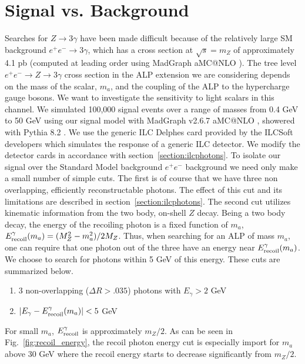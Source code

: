 \documentclass[aps,onecolumn,twoside,secnumarabic,12pt,balancelastpage,amsmath,amssymb,nofootinbib,hyperref=pdftex]{revtex4}
\begin{document}
\section{Signal vs. Background}
Searches for $Z\rightarrow 3\gamma$ have been made difficult because of the relatively large SM background $e^{+} e^{-} \rightarrow 3\gamma$, which has a cross section at $\sqrt{s} = m_{Z}$ of approximately 4.1 pb (computed at leading order using MadGraph aMC@NLO \cite{madgraph}).
\vskip 0.12in
The tree level $e^{+} e^{-} \rightarrow Z \rightarrow 3\gamma$ cross section in the ALP extension we are considering depends on the mass of the scalar, $m_{a}$,  and the coupling of the ALP to the hypercharge gauge bosons. We want to investigate the sensitivity to light scalars in this channel. We simulated 100,000 signal events over a range of masses from 0.4 GeV to 50 GeV using our signal model with MadGraph v2.6.7 aMC@NLO \cite{madgraph}, showered with Pythia 8.2 \cite{Sjostrand:2014zea}. We use the generic ILC Delphes card \cite{ILCDelphes} provided by the ILCSoft developers which simulates the response of a generic ILC detector. We modify the detector cards in accordance with section~\ref{section:ilcphotons}. To isolate our signal over the Standard Model background $e^{+}e^{-}$ background we need only make a small number of simple cuts. The first is of course that we have three non overlapping, efficiently reconstructable photons. The effect of this cut and its limitations are described in section~\ref{section:ilcphotons}. The second cut utilizes kinematic information from the two body, on-shell $Z$ decay. Being a two body decay, the energy of the recoiling photon is a fixed function of $m_{a}$, $E^{\gamma}_{\rm recoil}(m_{a}) = (M_{Z}^{2} - m_{a}^2)/2M_{Z}$. Thus, when searching for an ALP of mass $m_{a}$, one can require that one photon out of the three have an energy near $E^{\gamma}_{\rm recoil}(m_{a})$. We choose to search for photons within 5 GeV of this energy. These cuts are summarized below.
\begin{enumerate}
\item 3 non-overlapping ($\Delta R > .035$) photons with $E_{\gamma} > 2$ GeV
\item $|E_{\gamma} - E^{\gamma}_{\rm recoil}(m_{a})| < 5$ GeV
\end{enumerate}
For small $m_{a}$, $E^{\gamma}_{\rm recoil}$ is approximately $m_{Z}/2$. As can be seen in Fig.~\ref{fig:recoil_energy}, the recoil photon energy cut is especially import for $m_{a}$ above 30 GeV where the recoil energy starts to decrease significantly from $m_{Z}/2$.
\end{document}
